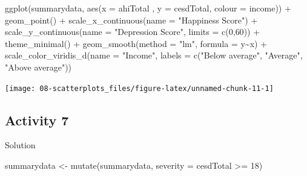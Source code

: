 \documentclass[
  oneside]{book}
\newenvironment{Shaded}{\begin{snugshade}}{\end{snugshade}}
\newcommand{\AttributeTok}[1]{\textcolor[rgb]{0.77,0.63,0.00}{#1}}
\newcommand{\DecValTok}[1]{\textcolor[rgb]{0.00,0.00,0.81}{#1}}
\newcommand{\FunctionTok}[1]{\textcolor[rgb]{0.00,0.00,0.00}{#1}}
\newcommand{\NormalTok}[1]{#1}
\newcommand{\OtherTok}[1]{\textcolor[rgb]{0.56,0.35,0.01}{#1}}
\newcommand{\SpecialCharTok}[1]{\textcolor[rgb]{0.00,0.00,0.00}{#1}}
\newcommand{\StringTok}[1]{\textcolor[rgb]{0.31,0.60,0.02}{#1}}
\begin{document}
\begin{Shaded}
\begin{Highlighting}[]
\FunctionTok{ggplot}\NormalTok{(summarydata, }\FunctionTok{aes}\NormalTok{(}\AttributeTok{x =}\NormalTok{ ahiTotal , }\AttributeTok{y =}\NormalTok{ cesdTotal, }
                        \AttributeTok{colour =}\NormalTok{ income)) }\SpecialCharTok{+} 
  \FunctionTok{geom\_point}\NormalTok{() }\SpecialCharTok{+}
  \FunctionTok{scale\_x\_continuous}\NormalTok{(}\AttributeTok{name =} \StringTok{"Happiness Score"}\NormalTok{) }\SpecialCharTok{+}
  \FunctionTok{scale\_y\_continuous}\NormalTok{(}\AttributeTok{name =} \StringTok{"Depression Score"}\NormalTok{,}
                     \AttributeTok{limits =} \FunctionTok{c}\NormalTok{(}\DecValTok{0}\NormalTok{,}\DecValTok{60}\NormalTok{)) }\SpecialCharTok{+}
  \FunctionTok{theme\_minimal}\NormalTok{() }\SpecialCharTok{+}
  \FunctionTok{geom\_smooth}\NormalTok{(}\AttributeTok{method =} \StringTok{"lm"}\NormalTok{, }\AttributeTok{formula =}\NormalTok{ y}\SpecialCharTok{\textasciitilde{}}\NormalTok{x) }\SpecialCharTok{+}
  \FunctionTok{scale\_color\_viridis\_d}\NormalTok{(}\AttributeTok{name =} \StringTok{"Income"}\NormalTok{, }
                       \AttributeTok{labels =} \FunctionTok{c}\NormalTok{(}\StringTok{"Below average"}\NormalTok{,}
                                  \StringTok{"Average"}\NormalTok{,}
                                  \StringTok{"Above average"}\NormalTok{))}
\end{Highlighting}
\end{Shaded}

\begin{center}\texttt{[image: 08-scatterplots\_files/figure-latex/unnamed-chunk-11-1]} \end{center}

\hypertarget{activity-7}{%
\subsection{Activity 7}\label{activity-7}}

Solution

\begin{Shaded}
\begin{Highlighting}[]
\NormalTok{summarydata }\OtherTok{\textless{}{-}} \FunctionTok{mutate}\NormalTok{(summarydata, }\AttributeTok{severity =}\NormalTok{ cesdTotal }\SpecialCharTok{\textgreater{}=} \DecValTok{18}\NormalTok{)}
\end{Highlighting}
\end{Shaded}
\end{document}

